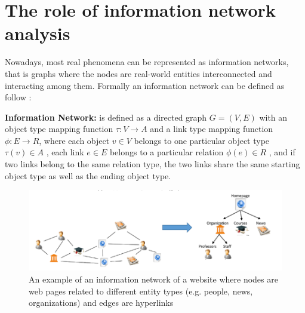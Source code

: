 \section{The role of information network analysis}
\color{green}
\color{red}

Nowadays, most real phenomena can be represented as information networks, that is graphs where the nodes are real-world entities interconnected and interacting among them. 
Formally an information network can be defined as follow \cite{Sun:2012}:
\begin{definition}
\label{def:network}\textbf{Information Network:}
is defined as a directed graph $G = ( V , E )$ with an object type mapping function $\tau : V \rightarrow A$ and a link type mapping function $\phi : E \rightarrow R$, where each object $v \in V$ belongs to one particular object type $\tau (v) \in A$ , each link $e \in E$
belongs to a particular relation $\phi(e) \in R$ , and if two links belong to the same relation type, the two
links share the same starting object type as well as the ending object type. 
\end{definition}

\begin{figure}[h]
\centering
\includegraphics[scale=0.40]{imgs/chap_1/informationNetwork1.png}
\caption{An example of an information network of a website where nodes are web pages related to different entity types (e.g. people, news, organizations) and edges are hyperlinks}
\label{fig:informationNetw}
\end{figure}


